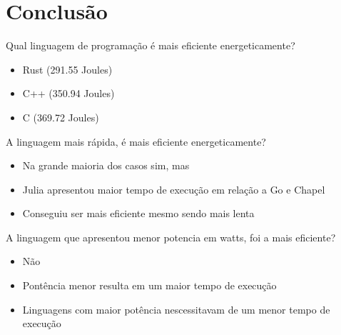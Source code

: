 \section{Conclusão}

\begin{frame}{Qual linguagem de programação é mais eficiente energeticamente?}
    \begin{itemize}
        \item Rust (291.55 Joules)
        \item C++ (350.94 Joules)
        \item C (369.72 Joules)
    \end{itemize}
\end{frame}

\begin{frame}{A linguagem mais rápida, é mais eficiente energeticamente?}
    \begin{itemize}
        \item Na grande maioria dos casos sim, mas
        \item Julia apresentou maior tempo de execução em relação a Go e Chapel
        \item Conseguiu ser mais eficiente mesmo sendo mais lenta
    \end{itemize}
\end{frame}

\begin{frame}{A linguagem que apresentou menor potencia em watts, foi a mais eficiente?}
    \begin{itemize}
        \item Não
        \item Pontência menor resulta em um maior tempo de execução
        \item Linguagens com maior potência nescessitavam de um menor tempo de execução
    \end{itemize}
\end{frame}


